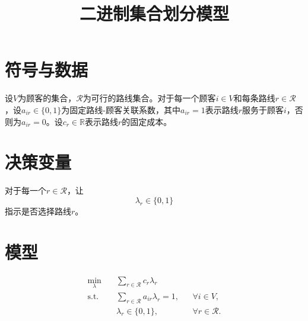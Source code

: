 \documentclass{article}
\title{二进制集合划分模型}
\author{}
\date{}
\begin{document}
\maketitle

\section*{符号与数据}
设$V$为顾客的集合，$\mathcal{R}$为可行的路线集合。对于每一个顾客$i\in V$和每条路线$r\in\mathcal{R}$，设$a_{ir}\in\{0,1\}$为固定路线-顾客关联系数，其中$a_{ir}=1$表示路线$r$服务于顾客$i$，否则为$a_{ir}=0$。设$c_r\in\mathbb{R}$表示路线$r$的固定成本。

\section*{决策变量}
对于每一个$r\in\mathcal{R}$，让
\[
\lambda_r\in\{0,1\}
\]
指示是否选择路线$r$。

\section*{模型}
\begin{align}
\min_{\lambda}\quad
&\sum_{r\in\mathcal{R}} c_r\lambda_r \\
\text{s.t.}\quad
&\sum_{r\in\mathcal{R}} a_{ir}\lambda_r=1,
&&\forall i\in V,\\
&\lambda_r\in\{0,1\},
&&\forall r\in\mathcal{R}.
\end{align}
\end{document}
